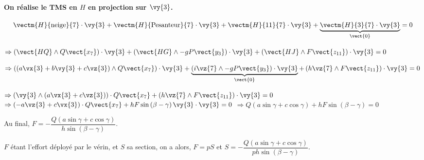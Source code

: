 \begin{corrigebox}
\paragraph*{On réalise le TMS en $H$ en projection sur $\vy{3}$.}

$$
\vectm{H}{\text{neige}}{7} \cdot \vy{3} + \vectm{H}{\text{Pesanteur}}{7} \cdot \vy{3} + \vectm{H}{11}{7} \cdot \vy{3} + \underbrace{\vectm{H}{3}{7} \cdot \vy{3}}_{\vect{0}} =0
$$

$
\Rightarrow
\left(\vect{HQ}\wedge Q\vect{x_7} \right) \cdot \vy{3} 
+ \left(\vect{HG}\wedge -gP\vect{y_3} \right) \cdot \vy{3} 
+ \left(\vect{HJ}\wedge F\vect{z_{11}} \right)  \cdot \vy{3}=0
$

$
\Rightarrow
\left(\left(a\vx{3}+b\vy{3}+c\vz{3}\right)\wedge Q\vect{x_7} \right) \cdot \vy{3} 
+ \underbrace{\left( i\vz{7}\wedge -gP\vect{y_3} \right) \cdot \vy{3}}_{\vect{0}}
+ \left(h\vz{7}\wedge F\vect{z_{11}} \right)  \cdot \vy{3}=0
$

$
\Rightarrow
\left(\vy{3} \wedge \left(a\vx{3}+c\vz{3}\right)  \right) \cdot   Q\vect{x_7}
+ \left(h\vz{7}\wedge F\vect{z_{11}} \right)  \cdot \vy{3}=0
$
$
\Rightarrow
\left( -a\vz{3}+c\vx{3}\right)   \cdot   Q\vect{x_7}
+ hF \sin\left(\beta - \gamma\right)\vy{3}  \cdot \vy{3}=0
$
$
\Rightarrow
Q\left( a\sin \gamma+c\cos\gamma \right)  
+ hF \sin\left(\beta - \gamma\right)=0
$

Au final, $F= - \dfrac{Q\left( a\sin \gamma+c\cos\gamma \right)  }{ h \sin\left(\beta - \gamma\right)}$.

$F$ étant l'effort déployé par le vérin, et $S$ sa section, on a alors, $F=pS$ et 
$S= - \dfrac{Q\left( a\sin \gamma+c\cos\gamma \right)  }{p h \sin\left(\beta - \gamma\right)}$.
\end{corrigebox}
